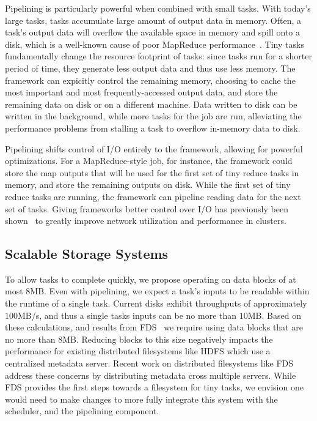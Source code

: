 Pipelining is particularly powerful when combined with small tasks. With
today's large tasks, tasks accumulate large amount of output data in memory.
Often, a task's output data will overflow the available space in memory
and spill onto a disk, which is a well-known cause of poor MapReduce
performance~\cite{toddlipconthing}. Tiny tasks fundamentally change the
resource footprint of tasks: since tasks run for a shorter period of time,
they generate less output data and thus use less memory. The framework can
expicitly control the remaining memory, choosing to cache the most important
and most frequently-accessed output data, and store the remaining data on disk
or on a different machine. Data written to disk can be written in the
background, while more tasks for the job are run, alleviating the performance
problems from stalling a task to overflow in-memory data to disk.

Pipelining shifts control of I/O entirely to the framework, allowing for
powerful optimizations.  For a MapReduce-style job, for instance, the
framework could store the map outputs that will be used for the first set of
tiny reduce tasks in memory, and store the remaining outputs on disk. While
the first set of tiny reduce tasks are running, the framework can pipeline
reading data for the next set of tasks.  Giving frameworks better control over
I/O has previously been shown~\cite{chowdhury2011managing, cohwdhury2012coflow}
to greatly improve network utilization and performance in clusters.

\subsection{Scalable Storage Systems}
To allow tasks to complete quickly, we propose operating on data blocks of
at most $8$MB. Even with pipelining, we
expect a task's inputs to be readable within the runtime of a single task. Current disks exhibit
throughputs of approximately $100$MB/s, and thus a single tasks inputs can be no more than $10$MB.
Based
on these calculations, and results from FDS~\cite{nightingale2012flat} we require using data blocks
that are no more than $8$MB. Reducing blocks to this size negatively impacts the performance for
existing distributed filesystems like HDFS which use a centralized metadata server. Recent work on
distributed filesystems like FDS address these concerns by distributing metadata cross multiple
servers. While FDS provides the first steps towards a filesystem for tiny tasks, we envision
one would need to make changes to more fully integrate this system with the scheduler, and
the pipelining component.

